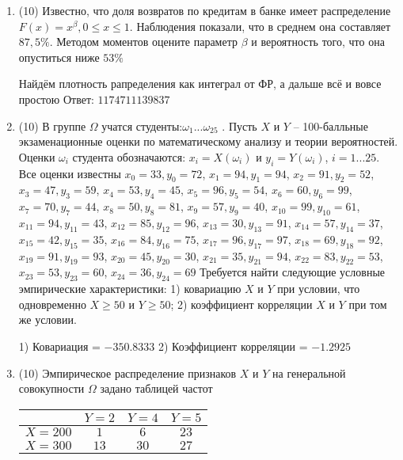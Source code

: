 \documentclass[a4paper,12pt]{article}
\begin{document}
\begin{enumerate}
\item


(10) Известно, что доля возвратов по кредитам в банке имеет распределение $F(x) = x ^{\beta}, 0 \leqslant x \leqslant 1$.
Наблюдения показали, что в среднем она составляет $87,5\%$. Методом моментов оцените параметр $\beta$ и
вероятность того, что она опуститься ниже $53\%$




Найдём плотность рапределения как интеграл от ФР, а дальше всё и вовсе простою Ответ: $1174711139837$


\item


(10) В группе $\Omega$ учатся студенты:$\omega _{1}...\omega _{25}$ . Пусть $X$ и $Y$ – 100-балльные экзаменационные оценки по
математическому анализу и теории вероятностей. Оценки $\omega _{i}$ студента обозначаются: $x _{i} = X(\omega _{i})$ и $y _{i} = Y(\omega _{i})$, $i = 1...25$. Все оценки известны
$x _{0} = 33, y _{0} = 72$, $x _{1} = 94, y _{1} = 94$, $x _{2} = 91, y _{2} = 52$, $x _{3} = 47, y _{3} = 59$, $x _{4} = 53, y _{4} = 45$, $x _{5} = 96, y _{5} = 54$, $x _{6} = 60, y _{6} = 99$, $x _{7} = 70, y _{7} = 44$, $x _{8} = 50, y _{8} = 81$, $x _{9} = 57, y _{9} = 40$, $x _{10} = 99, y _{10} = 61$, $x _{11} = 94, y _{11} = 43$, $x _{12} = 85, y _{12} = 96$, $x _{13} = 30, y _{13} = 91$, $x _{14} = 57, y _{14} = 37$, $x _{15} = 42, y _{15} = 35$, $x _{16} = 84, y _{16} = 75$, $x _{17} = 96, y _{17} = 97$, $x _{18} = 69, y _{18} = 92$, $x _{19} = 91, y _{19} = 93$, $x _{20} = 45, y _{20} = 30$, $x _{21} = 35, y _{21} = 94$, $x _{22} = 83, y _{22} = 53$, $x _{23} = 53, y _{23} = 60$, $x _{24} = 36, y _{24} = 69$
Требуется
найти следующие условные эмпирические характеристики: 1) ковариацию $X$ и $Y$ при условии, что одновременно $X \geqslant 50$
 и $Y \geqslant 50$; 2) коэффициент корреляции $X$ и $Y$ при том же условии.




1) Ковариация = $-350.8333$
2) Коэффициент корреляции = $-1.2925$


\item


(10) Эмпирическое распределение признаков $X$ и $Y$ на генеральной совокупности $\Omega$ задано таблицей частот  
 
\begin{tabular}{ | c | c | c | c | }
\hline
 & $Y = 2$ & $Y = 4$ & $Y = 5$  \\ \hline
$X = 200$ & $1$ & $6$ & $23$\\ \hline
$X = 300$ & $13$ & $30$ & $27$\\
\hline
\end{tabular}


\end{enumerate}
\end{document}
